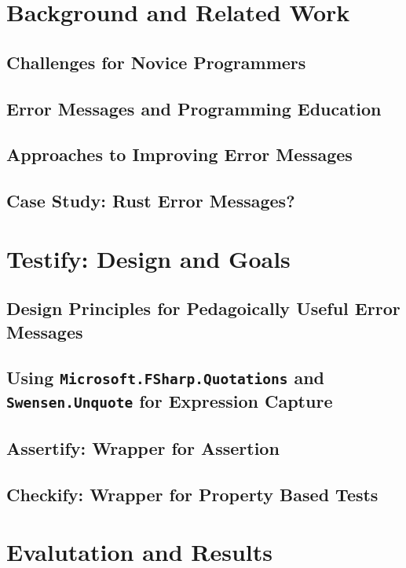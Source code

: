 \chapter{Background and Related Work}
    \section{Challenges for Novice Programmers}
    \section{Error Messages and Programming Education}
    \section{Approaches to Improving Error Messages}
    \section{Case Study: Rust Error Messages?}

\chapter{Testify: Design and Goals}
    \section{Design Principles for Pedagoically Useful Error Messages}
    \section{Using \texttt{Microsoft.FSharp.Quotations} and \texttt{Swensen.Unquote} for Expression Capture}
    \section{Assertify: Wrapper for Assertion}
    \section{Checkify: Wrapper for Property Based Tests}

\chapter{Evalutation and Results}
